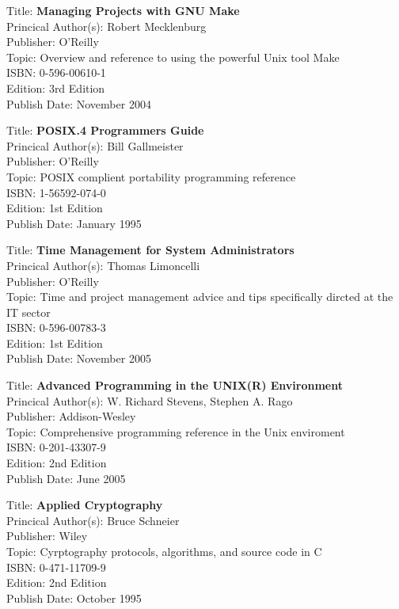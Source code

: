 Title: 	\textbf{Managing Projects with GNU Make}	\\
Princical Author(s): 	Robert Mecklenburg  \\
Publisher:	O'Reilly	\\	
Topic:		Overview and reference to using the powerful Unix tool Make \\
ISBN:			0-596-00610-1 \\
Edition:		3rd Edition \\
Publish Date:		November 2004

	
Title: 	\textbf{POSIX.4 Programmers Guide}	\\
Princical Author(s): 	Bill Gallmeister  \\
Publisher:	O'Reilly	\\	
Topic:		POSIX complient portability programming reference \\
ISBN:			1-56592-074-0 \\
Edition:		1st Edition \\
Publish Date:		January 1995

	
Title: 	\textbf{Time Management for System Administrators}	\\
Princical Author(s): 	Thomas Limoncelli  \\
Publisher:	O'Reilly	\\	
Topic:		Time and project management advice and tips specifically dircted at the IT sector \\
ISBN:			0-596-00783-3 \\
Edition:		1st Edition \\
Publish Date:		November 2005

	
Title: 	\textbf{Advanced Programming in the UNIX(R) Environment}	\\
Princical Author(s): 	W. Richard Stevens, Stephen A. Rago  \\
Publisher:	Addison-Wesley	\\	
Topic:		Comprehensive programming reference in the Unix enviroment \\
ISBN:			0-201-43307-9 \\
Edition:		2nd Edition \\
Publish Date:		June 2005


Title: 	\textbf{Applied Cryptography}	\\
Princical Author(s): 	Bruce Schneier  \\
Publisher:	Wiley	\\	
Topic:		Cyrptography protocols, algorithms, and source code in C \\
ISBN:			0-471-11709-9 \\
Edition:		2nd Edition \\
Publish Date:		October 1995


